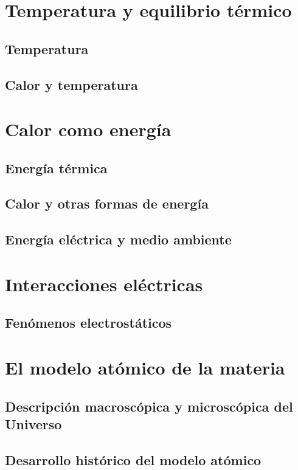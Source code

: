 \documentclass[11pt]{book}
\begin{document}
\section{Temperatura y equilibrio t\'ermico}
\subsection{Temperatura}
\subsection{Calor y temperatura}

\newpage \thispagestyle{plain}
\section{ Calor como energ\'ia}
\subsection{Energ\'ia t\'ermica}
\subsection{Calor y otras formas de energ\'ia}
\subsection{Energ\'ia el\'ectrica y medio ambiente}

\newpage \thispagestyle{plain}
\section{ Interacciones el\'ectricas}
\subsection{Fen\'omenos electrost\'aticos}
\newpage \thispagestyle{plain}
\section{ El modelo at\'omico de la materia}
\subsection{Descripci\'on macrosc\'opica y microsc\'opica del Universo}
\subsection{Desarrollo hist\'orico del modelo at\'omico}
\end{document}
